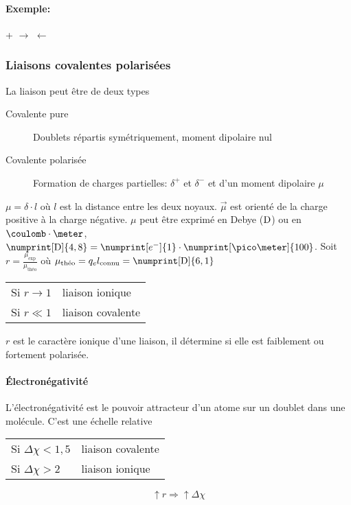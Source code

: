 \paragraph{Exemple:}
\begin{center}
	\hspace{0.3cm} + \hspace{0.3cm}$\longrightarrow$ $\leftarrow$
\end{center}
\subsubsection{Liaisons covalentes polarisées}
La liaison peut être de deux types
\begin{description}
	\item[Covalente pure] Doublets répartis symétriquement, moment dipolaire nul
	\item[Covalente polarisée] Formation de charges partielles:
      $\delta^+$ et $\delta^-$ et d'un moment dipolaire $\mu$
\end{description}
$\mu = \delta \cdot l$ où $l$ est la distance entre les deux noyaux.
$\vec{\mu}$ est orienté de la charge positive à la charge négative.
$\mu$ peut être exprimé en Debye ($\mathrm{D}$) ou en $\coulomb\cdot\meter$,
$\numprint[\debye]{4,8} = \numprint[e^-]{1} \cdot \numprint[\pico\meter]{100}$.
Soit $r = \frac{\mu_{\mathrm{exp}}}{\mu_{\textrm{théo}}}$
où $\mu_{\textrm{théo}} = q_e l_{\mathrm{connu}} = \numprint[\debye]{6,1}$
\begin{center}
	\begin{tabular}{ll}
		Si $r \to 1$ & liaison ionique\\
		Si $r \ll 1$ & liaison covalente
	\end{tabular}
\end{center}
$r$ est le caractère ionique d'une liaison, il détermine si elle est faiblement ou fortement polarisée.

\paragraph{\'Electronégativité}
L'électronégativité est le pouvoir attracteur d'un atome sur un doublet dans une molécule.
C'est une échelle relative
\begin{center}
	\begin{tabular}{ll}
		Si $\Delta \chi < 1,5$ & liaison covalente\\
		Si $\Delta \chi > 2$ & liaison ionique
	\end{tabular}
\end{center}
$$\uparrow r \Rightarrow \uparrow \Delta \chi$$

